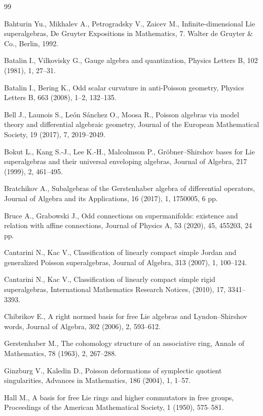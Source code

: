 \documentclass[11pt,reqno]{amsart}
\theoremstyle{plain}
\theoremstyle{definition}
\theoremstyle{remark}
\begin{document}
\begin{thebibliography}{99}

Bahturin Yu., Mikhalev A., Petrogradsky V., Zaicev M.,
Infinite-dimensional Lie superalgebras,
De Gruyter Expositions in Mathematics, 7. Walter de Gruyter \& Co., Berlin, 1992.

Batalin I., Vilkovisky G.,
Gauge algebra and quantization,
Physics Letters B, 102 (1981), 1, 27--31.

Batalin I., Bering K.,
Odd scalar curvature in anti-Poisson geometry,
Physics Letters B, 663 (2008), 1--2, 132--135.

Bell J., Launois S., Le\'on S\'anchez O., Moosa R.,
Poisson algebras via model theory and differential algebraic geometry,
Journal of the European Mathematical Society, 19 (2017), 7, 2019--2049.

Bokut L., Kang S.-J., Lee K.-H., Malcolmson P.,
Gr\"obner--Shirshov bases for Lie superalgebras and their universal enveloping algebras,
Journal of Algebra, 217 (1999), 2, 461--495.

Bratchikov A.,
Subalgebras of the Gerstenhaber algebra of differential operators,
Journal of Algebra and its Applications, 16 (2017), 1, 1750005, 6 pp.

Bruce A., Grabowski J.,
Odd connections on supermanifolds: existence and relation with affine connections,
Journal of Physics A, 53 (2020), 45, 455203, 24 pp.

Cantarini N., Kac V.,
Classification of linearly compact simple Jordan and generalized Poisson superalgebras,
Journal of Algebra, 313 (2007), 1, 100--124.

Cantarini N., Kac V.,
Classification of linearly compact simple rigid superalgebras,
International Mathematics Research Notices, (2010), 17, 3341--3393.

Chibrikov E.,
A right normed basis for free Lie algebras and Lyndon--Shirshov words,
Journal of Algebra, 302 (2006), 2, 593--612.

Gerstenhaber M.,
The cohomology structure of an associative ring,
Annals of Mathematics, 78 (1963), 2, 267--288.

Ginzburg V., Kaledin D.,
Poisson deformations of symplectic quotient singularities,
Advances in Mathematics, 186 (2004), 1, 1--57.

Hall M.,
A basis for free Lie rings and higher commutators in free groups,
Proceedings of the American Mathematical Society, 1 (1950), 575--581.


\end{thebibliography}
\end{document}
